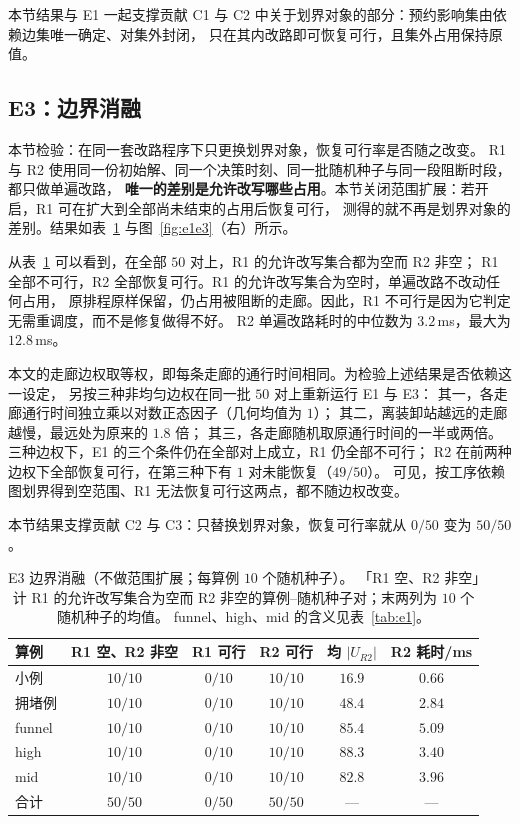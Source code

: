 \documentclass[manuscript,screen,review]{acmart}
\newcommand{\NSeeds}{10}
\newcommand{\NPairs}{50}
\newcommand{\FeasRone}{0/\NPairs}            %
\newcommand{\FeasRtwo}{\NPairs/\NPairs}      %
\newcommand{\MsRepairMed}{3.2}
\newcommand{\MsRepairMax}{12.8}
\newcommand{\WeightSplitRtwo}{49/\NPairs}
\begin{document}
本节结果与 E1 一起支撑贡献 C1 与 C2 中关于划界对象的部分：预约影响集由依赖边集唯一确定、对集外封闭，
只在其内改路即可恢复可行，且集外占用保持原值。

\subsection{E3：边界消融}
\label{sec:e3}

本节检验：在同一套改路程序下只更换划界对象，恢复可行率是否随之改变。
R1 与 R2 使用同一份初始解、同一个决策时刻、同一批随机种子与同一段阻断时段，都只做单遍改路，
\textbf{唯一的差别是允许改写哪些占用}。本节关闭范围扩展：若开启，R1 可在扩大到全部尚未结束的占用后恢复可行，
测得的就不再是划界对象的差别。结果如表~\ref{tab:e3} 与图~\ref{fig:e1e3}（右）所示。

从表~\ref{tab:e3} 可以看到，在全部 \(\NPairs\) 对上，R1 的允许改写集合都为空而 R2 非空；
R1 全部不可行，R2 全部恢复可行。R1 的允许改写集合为空时，单遍改路不改动任何占用，
原排程原样保留，仍占用被阻断的走廊。因此，R1 不可行是因为它判定无需重调度，而不是修复做得不好。
R2 单遍改路耗时的中位数为 \(\MsRepairMed\)\,ms，最大为 \(\MsRepairMax\)\,ms。

本文的走廊边权取等权，即每条走廊的通行时间相同。为检验上述结果是否依赖这一设定，
另按三种非均匀边权在同一批 \(\NPairs\) 对上重新运行 E1 与 E3：
其一，各走廊通行时间独立乘以对数正态因子（几何均值为 \(1\)）；
其二，离装卸站越远的走廊越慢，最远处为原来的 \(1.8\) 倍；
其三，各走廊随机取原通行时间的一半或两倍。
三种边权下，E1 的三个条件仍在全部对上成立，R1 仍全部不可行；
R2 在前两种边权下全部恢复可行，在第三种下有 \(1\) 对未能恢复（\(\WeightSplitRtwo\)）。
可见，按工序依赖图划界得到空范围、R1 无法恢复可行这两点，都不随边权改变。

本节结果支撑贡献 C2 与 C3：只替换划界对象，恢复可行率就从 \(\FeasRone\) 变为 \(\FeasRtwo\)。

\begin{table}[t]
\centering
\caption{E3 边界消融（不做范围扩展；每算例 \(\NSeeds\) 个随机种子）。
「R1 空、R2 非空」计 R1 的允许改写集合为空而 R2 非空的算例--随机种子对；末两列为 \(\NSeeds\) 个随机种子的均值。
funnel、high、mid 的含义见表~\ref{tab:e1}。}
\label{tab:e3}
\small
\begin{tabular}{@{}lccccc@{}}
\toprule
算例 & R1 空、R2 非空 & R1 可行 & R2 可行 & 均 \(|U_{R2}|\) & R2 耗时/ms \\
\midrule
小例   & \(10/10\) & \(0/10\) & \(10/10\) & \(16.9\) & \(0.66\) \\
拥堵例 & \(10/10\) & \(0/10\) & \(10/10\) & \(48.4\) & \(2.84\) \\
funnel  & \(10/10\) & \(0/10\) & \(10/10\) & \(85.4\) & \(5.09\) \\
high    & \(10/10\) & \(0/10\) & \(10/10\) & \(88.3\) & \(3.40\) \\
mid     & \(10/10\) & \(0/10\) & \(10/10\) & \(82.8\) & \(3.96\) \\
\midrule
合计 & \(\NPairs/\NPairs\) & \(\FeasRone\) & \(\FeasRtwo\) & --- & --- \\
\bottomrule
\end{tabular}
\end{table}
\end{document}
